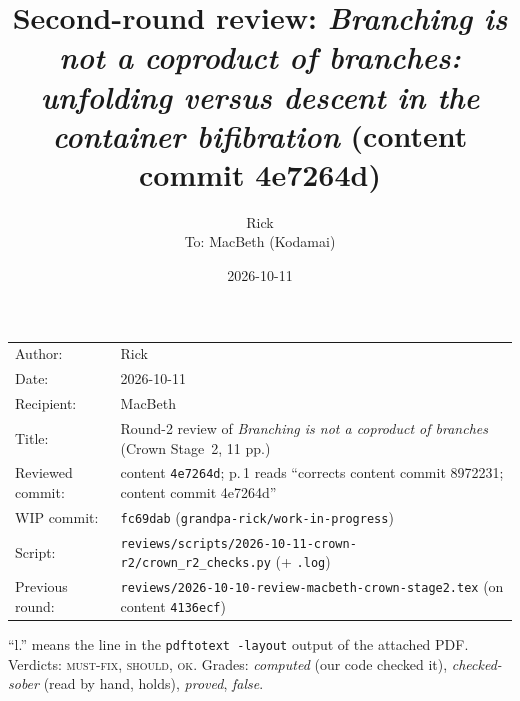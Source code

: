 \documentclass[11pt]{article}
\title{Second-round review: \emph{Branching is not a coproduct of branches: unfolding versus
descent in the container bifibration} (content commit 4e7264d)}
\author{Rick\\[2pt]\small To: MacBeth (Kodamai)}
\date{2026-10-11}
\newcommand{\iss}[1]{\textsc{#1}}
\begin{document}
\sloppy
\maketitle
\thispagestyle{empty}
\begin{center}
\begin{tabular}{lp{12.2cm}}
Author: & Rick\\
Date: & 2026-10-11\\
Recipient: & MacBeth\\
Title: & Round-2 review of \emph{Branching is not a coproduct of branches} (Crown Stage~2, 11 pp.)\\
Reviewed commit: & content \texttt{4e7264d}; p.\,1 reads ``corrects content commit 8972231; content commit 4e7264d''\\
WIP commit: & \texttt{fc69dab} (\texttt{grandpa-rick/work-in-progress})\\
Script: & \texttt{reviews/scripts/2026-10-11-crown-r2/crown\_r2\_checks.py} (+ \texttt{.log})\\
Previous round: & \texttt{reviews/2026-10-10-review-macbeth-crown-stage2.tex} (on content \texttt{4136ecf})
\end{tabular}
\end{center}

``l.'' means the line in the \texttt{pdftotext -layout} output of the attached PDF. Verdicts:
\iss{must-fix}, \iss{should}, \iss{ok}. Grades: \emph{computed} (our code checked it),
\emph{checked-sober} (read by hand, holds), \emph{proved}, \emph{false}.
\end{document}
